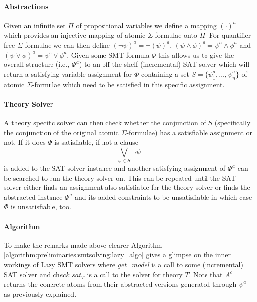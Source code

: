 \paragraph{Abstractions}
Given an infinite set $\Pi$ of propositional variables we define a mapping $(\cdot)^a$ which provides an injective mapping of atomic $\Sigma$-formulae onto $\Pi$. For quantifier-free $\Sigma$-formulae we can then define $\left(\neg\psi\right)^a=\neg\left(\psi\right)^a$, $\left(\psi\land\phi\right)^a=\psi^a\land\phi^a$ and $\left(\psi\lor\phi\right)^a=\psi^a\lor\phi^a$. Given some SMT formula $\Phi$ this allows us to give the overall structure (i.e., $\Phi^a$) to an off the shelf (incremental) SAT solver which will return a satisfying variable assignment for $\Phi$ containing a set $S=\{\psi_1^a,\dots,\psi_n^a\}$ of atomic $\Sigma$-formulae which need to be satisfied in this specific assignment.

\paragraph{Theory Solver}
A theory specific solver can then check whether the conjunction of $S$ (specifically the conjunction of the original atomic $\Sigma$-formulae) has a satisfiable assignment or not. If it does $\Phi$ is satisfiable, if not a clause \[\bigvee\limits_{\psi\in S} \neg\psi\] is added to the SAT solver instance and another satisfying assignment of $\Phi^a$ can be searched to run the theory solver on. This can be repeated until the SAT solver either finds an assignment also satisfiable for the theory solver or finds the abstracted instance $\Phi^a$ and its added constraints to be unsatisfiable in which case $\Phi$ is unsatisfiable, too.

\paragraph{Algorithm}
To make the remarks made above clearer Algorithm \ref{algorithm:preliminaries:smtsolving:lazy_algo} gives a glimpse on the inner workings of Lazy SMT solvers where \textit{get\_model} is a call to some (incremental) SAT solver and $\textit{check\_sat}_T$ is a call to the solver for theory $T$.
Note that $A^c$ returns the concrete atoms from their abstracted versions generated through $\psi^a$ as previously explained.


